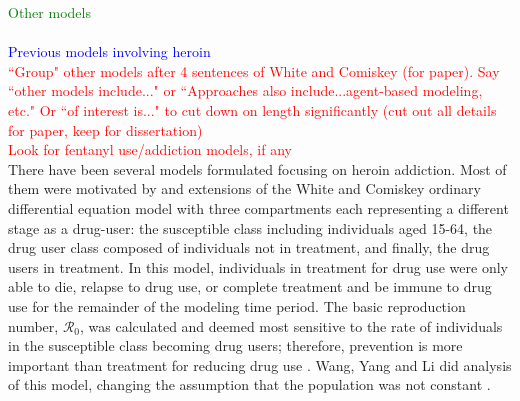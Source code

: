 \documentclass[12pt]{article}
\begin{document}
\textcolor{green}{Other models} \\ \\
\textcolor{blue}{Previous models involving heroin} \\
\textcolor{red}{``Group" other models after 4 sentences of White and Comiskey (for paper). Say ``other models include..." or ``Approaches also include...agent-based modeling, etc." Or ``of interest is..." to cut down on length significantly (cut out all details for paper, keep for dissertation)} \\
\textcolor{red}{Look for fentanyl use/addiction models, if any} \\
There have been several models formulated focusing on heroin addiction. Most of them were motivated by and extensions of the White and Comiskey ordinary differential equation model with three compartments each representing a different stage as a drug-user: the susceptible class including individuals aged 15-64, the drug user class composed of individuals not in treatment, and finally, the drug users in treatment. In this model, individuals in treatment for drug use were only able to die, relapse to drug use, or complete treatment and be immune to drug use for the remainder of the modeling time period. The basic reproduction number, $\mathscr{R}_0$, was calculated and deemed most sensitive to the rate of individuals in the susceptible class becoming drug users; therefore, prevention is more important than treatment for reducing drug use \cite{White}. Wang, Yang and Li did analysis of this model, changing the assumption that the population was not constant \cite{Wang}. 

\end{document}

